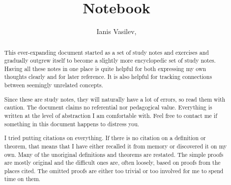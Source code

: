 \documentclass{scrartcl}
\title{Notebook}
\subtitle{\URL{https://github.com/v--/notebook}}
\author{Ianis Vasilev, \Email{ianis@ivasilev.net}}
\date{}
\begin{document}
\hfuzz=3pt
\maketitle

\begin{abstract}
  This ever-expanding document started as a set of study notes and exercises and gradually outgrew itself to become a slightly more encyclopedic set of study notes. Having all these notes in one place is quite helpful for both expressing my own thoughts clearly and for later reference. It is also helpful for tracking connections between seemingly unrelated concepts.

  Since these are study notes, they will naturally have a lot of errors, so read them with caution. The document claims no referential nor pedagogical value. Everything is written at the level of abstraction I am comfortable with. Feel free to contact me if something in this document happens to distress you.

  I tried putting citations on everything. If there is no citation on a definition or theorem, that means that I have either recalled it from memory or discovered it on my own. Many of the unoriginal definitions and theorems are restated. The simple proofs are mostly original and the difficult ones are, often loosely, based on proofs from the places cited. The omitted proofs are either too trivial or too involved for me to spend time on them.
\end{abstract}

\newpage
\tableofcontents
\newpage

























\end{document}

